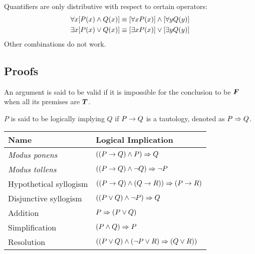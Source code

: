 \begin{remark}
    Quantifiers are only distributive with respect to certain operators:
    \begin{align*}
        \forall x [P(x) \wedge Q(x)] &\equiv [\forall x P(x)] \wedge [\forall y Q(y)] \\
        \exists x [P(x) \vee Q(x)] &\equiv [\exists x P(x)] \vee [\exists y Q(y)]
    \end{align*}
    Other combinations do not work.
\end{remark}

\subsection{Proofs}

\begin{definition}
    An argument is said to be valid if it is impossible for the conclusion to be $\bm{F}$
    when all its premises are $\bm{T}$.
\end{definition}

\begin{definition}
    $P$ is said to be logically implying $Q$ if $P \rightarrow Q$ is a tautology, denoted
    as $P \Rightarrow Q$.
\end{definition}

\begin{theorem} \quad\par
    \begin{center}
        \begin{tabular}{ll}
            \textbf{Name} & \textbf{Logical Implication} \\
            \hline
            \textit{Modus ponens} & $((P \rightarrow Q) \land P) \Rightarrow Q$ \\
            \textit{Modus tollens} & $((P \rightarrow Q) \land \neg Q) \Rightarrow \neg P$ \\
            Hypothetical syllogism & $((P \rightarrow Q) \land (Q \rightarrow R)) \Rightarrow (P \rightarrow R)$ \\
            Disjunctive syllogism & $((P \lor Q) \land \neg P) \Rightarrow Q$ \\
            Addition & $P \Rightarrow (P \lor Q)$ \\
            Simplification & $(P \land Q) \Rightarrow P$ \\
            Resolution & $((P \lor Q) \land (\neg P \lor R) \Rightarrow (Q \lor R))$
        \end{tabular}
    \end{center}
\end{theorem}

